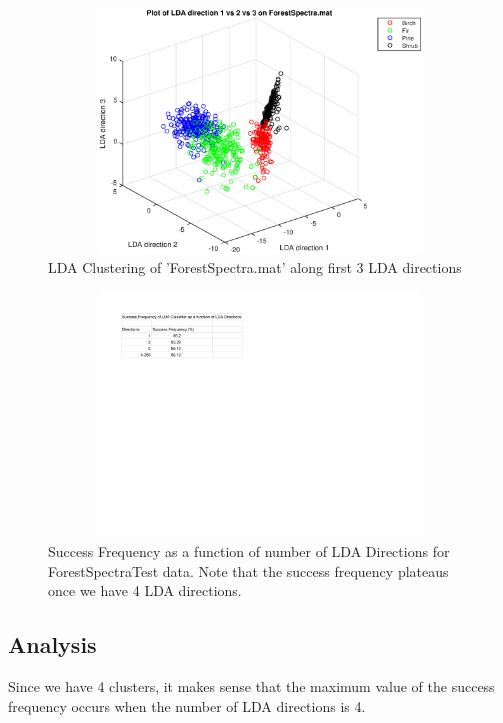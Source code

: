 \documentclass{article}
\begin{document}
\begin{figure}[H]
    \centerline
    {
    \includegraphics[width=15cm, height=6.5cm]{Q3_3directions}
    }
    \caption{\label{fig:my figure} LDA Clustering of 'ForestSpectra.mat' along first 3 LDA directions }
\end{figure}

\begin{figure}[H]
    \centerline
    {
    \includegraphics[width=15cm, height=6.5cm]{Q3_SF}
    }
    \caption{\label{fig:my figure} Success Frequency as a function of number of LDA Directions for ForestSpectraTest data.  Note that the success frequency plateaus once we have 4 LDA directions.}
\end{figure}

\subsection*{Analysis}
Since we have 4 clusters, it makes sense that the maximum value of the success frequency occurs when the number of LDA directions is 4.  
\end{document}
